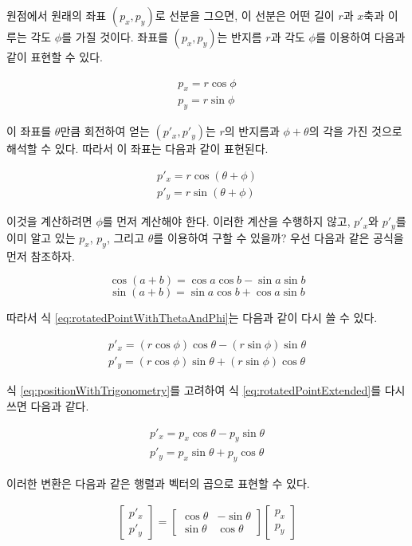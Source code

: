 원점에서 원래의 좌표 $(p_x,p_y)$로 선분을 그으면, 이 선분은 어떤 길이 $r$과 $x$축과 이루는 각도 $\phi$를 가질 것이다.
좌표를 $(p_x,p_y)$는 반지름 $r$과 각도 $\phi$를 이용하여 다음과 같이 표현할 수 있다.

\begin{eqnarray}
p_x = r \cos \phi \\ \nonumber
p_y = r \sin \phi
\label{eq:positionWithTrigonometry}
\end{eqnarray}

이 좌표를 $\theta$만큼 회전하여 얻는 $(p'_x , p'_y)$는 $r$의 반지름과 $\phi+\theta$의 각을 가진 것으로 해석할 수 있다.
따라서 이 좌표는 다음과 같이 표현된다.

\begin{eqnarray}
p'_x = r \cos (\theta+ \phi) \\ \nonumber
p'_y = r \sin (\theta + \phi)
\label{eq:rotatedPointWithThetaAndPhi}
\end{eqnarray}


이것을 계산하려면 $\phi$를 먼저 계산해야 한다. 이러한 계산을 수행하지 않고, $p'_x$와 $p'_y$를 이미 알고 있는 $p_x$, $p_y$, 그리고 $\theta$를 이용하여
구할 수 있을까? 우선 다음과 같은 공식을 먼저 참조하자.

$$\cos (a+b) = \cos a \cos b - \sin a \sin b$$
$$\sin (a+b) = \sin a \cos b + \cos a \sin b$$

따라서 식 \ref{eq:rotatedPointWithThetaAndPhi}는 다음과 같이 다시 쓸 수 있다.

\begin{eqnarray}
p'_x = (r \cos \phi) \cos \theta - (r \sin \phi )\sin \theta \\ \nonumber
p'_y = (r \cos \phi) \sin \theta + (r \sin \phi )\cos \theta 
\label{eq:rotatedPointExtended}
\end{eqnarray}

식 \ref{eq:positionWithTrigonometry}를 고려하여 식 \ref{eq:rotatedPointExtended}를 다시 쓰면 다음과 같다.

\begin{eqnarray}
p'_x = p_x \cos \theta - p_y \sin \theta \\ \nonumber
p'_y = p_x \sin \theta + p_y \cos \theta 
\label{eq:rotatedPoint}
\end{eqnarray}

이러한 변환은 다음과 같은 행렬과 벡터의 곱으로 표현할 수 있다.

\begin{eqnarray}
\left [
\begin{array}{c}
p'_x \\ p'_y
\end{array}
\right ] =
\left [
\begin{array}{cc}
\cos \theta & - \sin \theta \\
\sin \theta & \cos \theta
\end{array}
\right ]
\left [
\begin{array}{c}
p_x \\
p_y
\end{array}
\right ]
\label{eq:rotationWithMatrixTransform}
\end{eqnarray}

